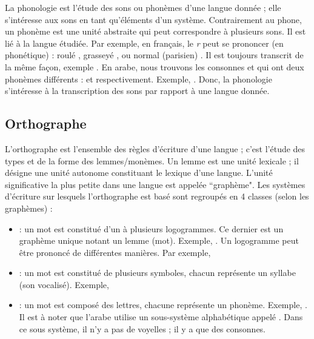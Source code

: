 \documentclass{KodeBook}
\begin{document}
La phonologie est l'étude des sons ou phonèmes d'une langue donnée ; elle s'intéresse aux sons en tant qu'éléments d'un système. 
Contrairement au phone, un phonème est une unité abstraite qui peut correspondre à plusieurs sons.
Il est lié à la langue étudiée. 
Par exemple, en français, le \textit{r} peut se prononcer (en phonétique) : roulé \expword{\textipa{[r]}}, grasseyé \expword{\textipa{[\;R]}}, ou normal (parisien) \expword{\textipa{[K]}}. 
Il est toujours transcrit de la même façon, exemple . 
En arabe, nous trouvons les consonnes  et  qui ont deux phonèmes différents :  et  respectivement. 
Exemple, . 
Donc, la phonologie s'intéresse à la transcription des sons par rapport à une langue donnée.

\subsection{Orthographe}

L'orthographe est l'ensemble des règles d'écriture d'une langue ; c'est l'étude des types et de la forme des lemmes/monèmes. 
Un lemme est une unité lexicale ; il désigne une unité autonome constituant le lexique d'une langue.
L'unité significative la plus petite dans une langue est appelée ``graphème".
Les systèmes d'écriture sur lesquels l'orthographe est basé sont regroupés en 4 classes (selon les graphèmes) : 
\begin{itemize}
	\item {} : un mot est constitué d'un à plusieurs logogrammes.
	Ce dernier est un graphème unique notant un lemme (mot).
	Exemple, .
	Un logogramme peut être prononcé de différentes manières. 
	Par exemple, 
	
	\item {} : un mot est constitué de plusieurs symboles, chacun représente un syllabe (son vocalisé). 
	Exemple, 
	
	\item {} : un mot est composé des lettres, chacune représente un phonème. 
	Exemple, . 
	Il est à noter que l'arabe utilise un sous-système alphabétique appelé . 
	Dans ce sous système, il n'y a pas de voyelles ; il y a que des consonnes.
\end{itemize}
\end{document}
